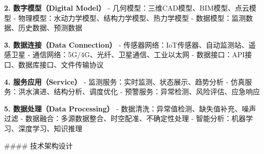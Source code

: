 \textbf{2. 数字模型（Digital Model）} - 几何模型：三维CAD模型、BIM模型、点云模型 - 物理模型：水动力学模型、结构力学模型、热力学模型 - 数据模型：监测数据、历史数据、预测数据

\textbf{3. 数据连接（Data Connection）} - 传感器网络：IoT传感器、自动监测站、遥感卫星 - 通信网络：5G/4G、光纤、卫星通信、工业以太网 - 数据接口：API接口、数据库接口、文件传输协议

\textbf{4. 服务应用（Service）} - 监测服务：实时监测、状态展示、趋势分析 - 仿真服务：洪水演进、结构分析、调度优化 - 预警服务：异常检测、风险评估、应急响应

\textbf{5. 数据处理（Data Processing）} - 数据清洗：异常值检测、缺失值补充、噪声过滤 - 数据融合：多源数据整合、时空配准、不确定性处理 - 智能分析：机器学习、深度学习、知识推理

\#\#\#\# 技术架构设计

